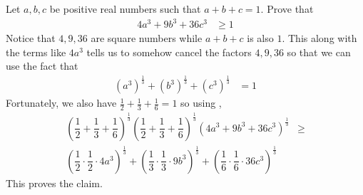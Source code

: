 \documentclass[inequalities.tex]{subfile}
\begin{document}
		\begin{problem}
			Let $a,b,c$ be positive real numbers such that $a+b+c=1$. Prove that
				\begin{align*}
					4a^{3}+9b^{3}+36c^{3}
						& \geq 1
				\end{align*}
			Notice that $4,9,36$ are square numbers while $a+b+c$ is also $1$. This along with the terms like $4a^{3}$ tells us to somehow cancel the factors $4,9,36$ so that we can use the fact that
				\begin{align*}
					\left(a^{3}\right)^{\frac{1}{3}}+\left(b^{3}\right)^{\frac{1}{3}}+\left(c^{3}\right)^{\frac{1}{3}}
						& = 1
				\end{align*}
			Fortunately, we also have $\frac{1}{2}+\frac{1}{3}+\frac{1}{6}=1$ so using ,
				\begin{align*}
					\left(\dfrac{1}{2}+\dfrac{1}{3}+\dfrac{1}{6}\right)^{\frac{1}{3}}\left(\dfrac{1}{2}+\dfrac{1}{3}+\dfrac{1}{6}\right)^{\frac{1}{3}}\left(4a^{3}+9b^{3}+36c^{3}\right)^{\frac{1}{3}}
						& \geq\\ \left(\dfrac{1}{2}\cdot\dfrac{1}{2}\cdot4a^{3}\right)^{\frac{1}{3}}+\left(\dfrac{1}{3}\cdot\dfrac{1}{3}\cdot9b^{3}\right)^{\frac{1}{3}}+\left(\dfrac{1}{6}\cdot\dfrac{1}{6}\cdot36c^{3}\right)^{\frac{1}{3}}
				\end{align*}
			This proves the claim.
		\end{problem}
\end{document}
